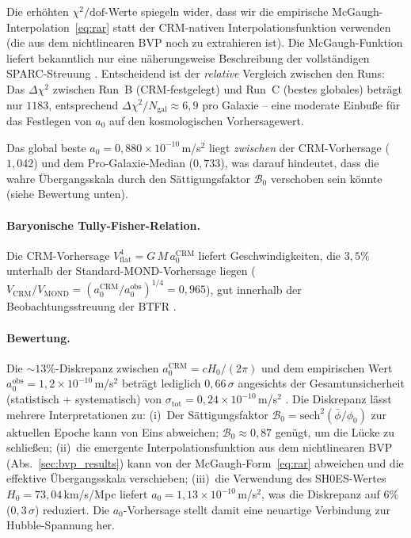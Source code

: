 \documentclass[aps,prd,twocolumn,superscriptaddress,nofootinbib]{revtex4-2}
\begin{document}
Die erh\"ohten $\chi^2/\mathrm{dof}$-Werte spiegeln wider, dass wir die empirische McGaugh-Interpolation~\eqref{eq:rar} statt der CRM-nativen Interpolationsfunktion verwenden (die aus dem nichtlinearen BVP noch zu extrahieren ist). Die McGaugh-Funktion liefert bekanntlich nur eine n\"aherungsweise Beschreibung der vollst\"andigen SPARC-Streuung \cite{Li2018}. Entscheidend ist der \textit{relative} Vergleich zwischen den Runs: Das $\Delta\chi^2$ zwischen Run~B (CRM-festgelegt) und Run~C (bestes globales) betr\"agt nur $1183$, entsprechend $\Delta\chi^2/N_{\mathrm{gal}} \approx 6{,}9$ pro Galaxie -- eine moderate Einbu\ss{}e f\"ur das Festlegen von $a_0$ auf den kosmologischen Vorhersagewert.

Das global beste $a_0 = 0{,}880 \times 10^{-10}$\,m/s$^2$ liegt \textit{zwischen} der CRM-Vorhersage ($1{,}042$) und dem Pro-Galaxie-Median ($0{,}733$), was darauf hindeutet, dass die wahre \"Ubergangs\-skala durch den S\"attigungsfaktor $\mathcal{B}_0$ verschoben sein k\"onnte (siehe Bewertung unten).

\paragraph{Baryonische Tully-Fisher-Relation.}
Die CRM-Vorhersage $V_{\mathrm{flat}}^4 = G\,M\,a_0^{\mathrm{CRM}}$ liefert Geschwindigkeiten, die $3{,}5\%$ unterhalb der Standard-MOND-Vorhersage liegen ($V_{\mathrm{CRM}}/V_{\mathrm{MOND}} = (a_0^{\mathrm{CRM}}/a_0^{\mathrm{obs}})^{1/4} = 0{,}965$), gut innerhalb der Beobachtungsstreuung der BTFR \cite{McGaugh2012}.

\paragraph{Bewertung.}
Die $\sim 13\%$-Diskrepanz zwischen $a_0^{\mathrm{CRM}} = cH_0/(2\pi)$ und dem empirischen Wert $a_0^{\mathrm{obs}} = 1{,}2 \times 10^{-10}$\,m/s$^2$ betr\"agt lediglich $0{,}66\,\sigma$ angesichts der Gesamtunsicherheit (statistisch + systematisch) von $\sigma_{\mathrm{tot}} = 0{,}24 \times 10^{-10}$\,m/s$^2$ \cite{McGaugh2016}. Die Diskrepanz l\"asst mehrere Interpretationen zu: (i)~Der S\"attigungsfaktor $\mathcal{B}_0 = \mathrm{sech}^2(\bar{\phi}/\phi_0)$ zur aktuellen Epoche kann von Eins abweichen; $\mathcal{B}_0 \approx 0{,}87$ gen\"ugt, um die L\"ucke zu schlie\ss{}en; (ii)~die emergente Interpolationsfunktion aus dem nichtlinearen BVP (Abs.~\ref{sec:bvp_results}) kann von der McGaugh-Form~\eqref{eq:rar} abweichen und die effektive \"Ubergangsskala verschieben; (iii)~die Verwendung des SH0ES-Wertes $H_0 = 73{,}04$\,km/s/Mpc \cite{Riess2022} liefert $a_0 = 1{,}13 \times 10^{-10}$\,m/s$^2$, was die Diskrepanz auf $6\%$ ($0{,}3\,\sigma$) reduziert. Die $a_0$-Vorhersage stellt damit eine neuartige Verbindung zur Hubble-Spannung her.
\end{document}
